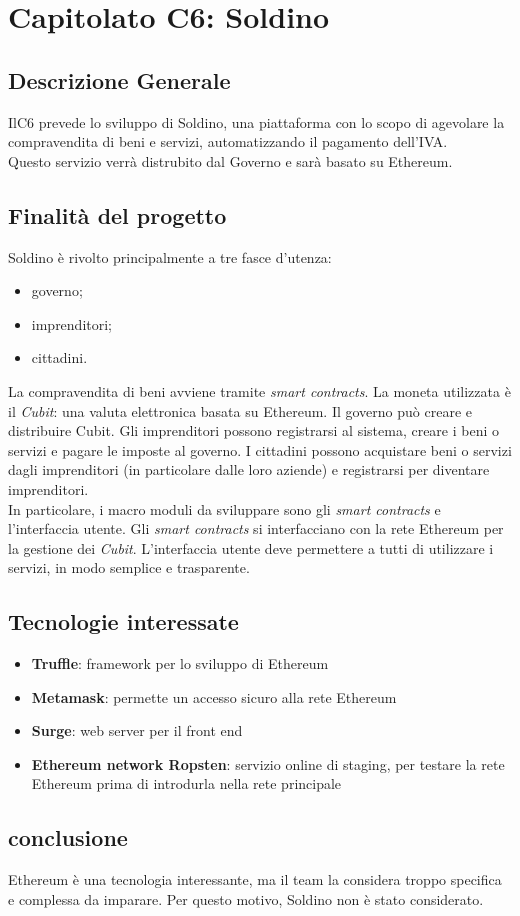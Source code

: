 \chapter{Capitolato C6: Soldino}
\section{Descrizione Generale}

IlC6 prevede lo sviluppo di Soldino, una piattaforma con lo scopo di agevolare la compravendita di beni e servizi, automatizzando il pagamento dell'IVA.\\
Questo servizio verrà distrubito dal Governo e sarà basato su Ethereum. 


\section{Finalit\`a del progetto}
Soldino è rivolto principalmente a tre fasce d'utenza:
\begin{itemize}
	\item governo;
	\item imprenditori;
	\item cittadini.
\end{itemize}
La compravendita di beni avviene tramite \textit{smart contracts}. La moneta utilizzata è il \textit{Cubit}: una valuta elettronica basata su Ethereum.
Il governo può creare e distribuire Cubit. Gli imprenditori possono registrarsi al sistema, creare i beni o servizi e pagare le imposte al governo. I cittadini possono acquistare beni o servizi dagli imprenditori (in particolare dalle loro aziende) e registrarsi per diventare imprenditori.\\
In particolare, i macro moduli da sviluppare sono gli \textit{smart contracts} e l'interfaccia utente. Gli \textit{smart contracts} si interfacciano con la rete Ethereum per la gestione dei \textit{Cubit}. L'interfaccia utente deve permettere a tutti di utilizzare i servizi, in modo semplice e trasparente.


\section{Tecnologie interessate}
\begin{itemize}
	\item \textbf{Truffle}: framework per lo sviluppo di Ethereum
	\item \textbf{Metamask}: permette un accesso sicuro alla rete Ethereum
	\item \textbf{Surge}: web server per il front end
	\item \textbf{Ethereum network Ropsten}: servizio online di staging, per testare la rete Ethereum prima di introdurla nella rete principale
	
\end{itemize}
\section{conclusione}
Ethereum è una tecnologia interessante, ma il team la considera troppo specifica e complessa da imparare. Per questo motivo, Soldino non è stato considerato. 